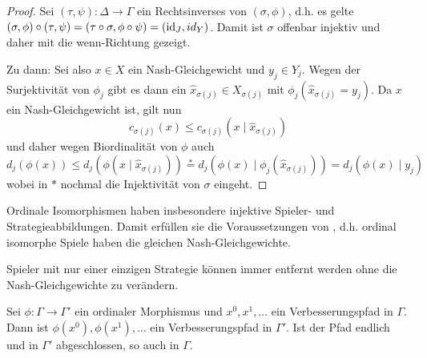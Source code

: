 \begin{proof}
	Sei $(\tau, \psi): \Delta \to \Gamma$ ein Rechtsinverses von $(\sigma, \phi)$, d.h. es gelte $(\sigma, \phi) \circ (\tau, \psi) = (\tau\circ\sigma, \phi\circ\psi) = (\mathrm{id}_J, id_Y)$. Damit ist $\sigma$ offenbar injektiv und daher mit  die \glqq wenn\grqq-Richtung gezeigt.
	
	Zu \glqq dann\grqq: Sei also $x \in X$ ein Nash-Gleichgewicht und $y_j \in Y_j$. Wegen der Surjektivität von $\phi_j$ gibt es dann ein $\hat{x}_{\sigma(j)} \in X_{\sigma(j)}$ mit $\phi_j(\hat{x}_{\sigma(j)} = y_j)$. Da $x$ ein Nash-Gleichgewicht ist, gilt nun 
	\[c_{\sigma(j)}(x) \leq c_{\sigma(j)}(x \mid \hat{x}_{\sigma(j)})\]
	und daher wegen Biordinalität von $\phi$ auch 
	\[d_j(\phi(x)) \leq d_j(\phi(x \mid \hat{x}_{\sigma(j)})) \overset{\ast}{=} d_j(\phi(x) \mid \phi_j(\hat{x}_{\sigma(j)})) = d_j(\phi(x) \mid y_j)\]
	wobei in $\ast$ nochmal die Injektivität von $\sigma$ eingeht.
\end{proof}


\begin{bsp}
	Ordinale Isomorphismen haben insbesondere injektive Spieler- und Strategieabbildungen. Damit erfüllen sie die Voraussetzungen von , d.h. ordinal isomorphe Spiele haben die gleichen Nash-Gleichgewichte.
\end{bsp}

\begin{bsp}
	Spieler mit nur einer einzigen Strategie können immer entfernt werden ohne die Nash-Gleichgewichte zu verändern. 
	
\end{bsp}

\begin{prop}\label{prop:ordMorphVerbPf}
	Sei $\phi: \Gamma \to \Gamma'$ ein ordinaler Morphismus und $x^0, x^1, \dots$ ein Verbesserungspfad in $\Gamma$. Dann ist $\phi(x^0), \phi(x^1), \dots$ ein Verbesserungspfad in $\Gamma'$. Ist der Pfad endlich und in $\Gamma'$ abgeschlossen, so auch in $\Gamma$.
\end{prop}

